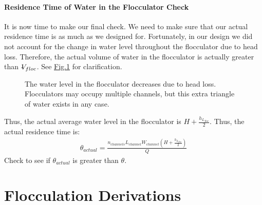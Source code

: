 \documentclass[letterpaper,10pt,english]{sphinxmanual}
\let\sphinxpxdimen\pdfpxdimen\else\newdimen\sphinxpxdimen
\begin{document}
\subsubsection{Residence Time of Water in the Flocculator Check}
\label{\detokenize{Flocculation/Floc_Design:residence-time-of-water-in-the-flocculator-check}}
It is now time to make our final check. We need to make sure that our actual residence time is  as much as we designed for. Fortunately, in our design we did not account for the change in water level throughout the flocculator due to head loss. Therefore, the actual volume of water in the flocculator is actually greater than \(\rlap{-} V_{floc}\). See \hyperref[\detokenize{Flocculation/Floc_Design:figure-flocculator-head-loss}]{Fig.\@ \ref{\detokenize{Flocculation/Floc_Design:figure-flocculator-head-loss}}} for clarification.

\begin{figure}[htbp]
\centering
\capstart

\noindent\sphinxincludegraphics[width=400\sphinxpxdimen]{{Flocculator_head_loss}.jpg}
\caption{The water level in the flocculator decreases due to head loss. Flocculators may occupy multiple channels, but this extra triangle of water exists in any case.}\label{\detokenize{Flocculation/Floc_Design:id17}}\label{\detokenize{Flocculation/Floc_Design:figure-flocculator-head-loss}}\end{figure}

Thus, the actual average water level in the flocculator is \(H + \frac{h_{L_{floc}}}{2}\). Thus, the actual residence time is:
\begin{equation}\label{equation:Flocculation/Floc_Design:Flocculation/Floc_Design:31}
\begin{split}\theta_{actual} = \frac{n_{channels} L_{channel} W_{channel} \left( H + \frac{h_{L_{floc}}}{2} \right)} {Q}\end{split}
\end{equation}
Check to see if \(\theta_{actual}\) is greater than \(\theta\).




\chapter{Flocculation Derivations}
\label{\detokenize{Flocculation/Floc_Derivations:flocculation-derivations}}\label{\detokenize{Flocculation/Floc_Derivations:title-flocculation-derivations}}\label{\detokenize{Flocculation/Floc_Derivations::doc}}
\end{document}
